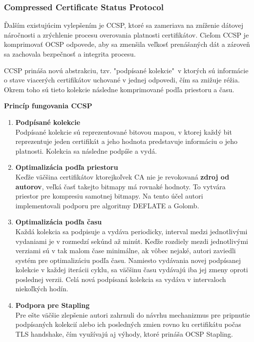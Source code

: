 \documentclass[12pt, twoside]{book}
\newcommand{\subsubsubsection}[1]{%
  \vspace{0.2em}  
  \textbf{#1} \\[0.2em]
  \hspace*{\parindent}
}
\begin{document}
\subsubsection{Compressed Certificate Status Protocol}
Ďalším existujúcim vylepšením je CCSP, ktoré sa zameriava na zníženie dátovej náročnosti a zrýchlenie procesu overovania platnosti certifikátov. Cieľom CCSP je komprimovať OCSP odpovede, aby sa zmenšila veľkosť prenášaných dát a zároveň sa zachovala bezpečnosť a integrita procesu.

CCSP prináša novú abstrakciu, tzv. "podpísané kolekcie"\, v ktorých sú informácie o stave viacerých certifikátov uchované v jednej odpovedi, čím sa znižuje réžia. Okrem toho sú tieto kolekcie následne komprimované podľa priestoru a času.

\subsubsubsection{Princíp fungovania CCSP}

\begin{enumerate} 
\item \textbf{Podpísané kolekcie} \\
Podpísané kolekcie sú reprezentované bitovou mapou, v ktorej každý bit reprezentuje jeden certifikát a jeho hodnota predstavuje informáciu o jeho platnosti. Kolekcia sa následne podpíše a vydá.


\item \textbf{Optimalizácia podľa priestoru} \\
Keďže väčšina certifikátov ktorejkoľvek CA nie je revokovaná \textbf{zdroj od autorov}, veľká časť takejto bitmapy má rovnaké hodnoty. To vytvára priestor pre kompresiu samotnej bitmapy. Na tento účel autori implementovali podporu pre algoritmy DEFLATE a Golomb.

\item \textbf{Optimalizácia podľa času} \\
Každá kolekcia sa podpisuje a vydáva periodicky, interval medzi jednotlivými vydaniami je v rozmedzí sekúnd až minút. Keďže rozdiely mezdi jednotlivými verziami sú v tak malom čase minimálne, ak vôbec nejaké, autori zaviedli systém pre optimalizáciu podľa času. Namiesto vydávania novej podpísanej kolekcie v každej iterácii cyklu,  sa väčšinu času vydávajú iba jej zmeny oproti poslednej verzii. Celá nová podpísaná kolekcia sa vydáva v intervaloch niekoľkých hodín.

\item \textbf{Podpora pre Stapling} \\
Pre ešte väčšie zlepšenie autori zahrnuli do návrhu mechanizmus pre pripnutie podpísaných kolekcií alebo ich posledných zmien rovno ku certifikátu počas TLS handshake, čím využívajú aj výhody, ktoré prináša OCSP Stapling.
\end{enumerate}
\end{document}
